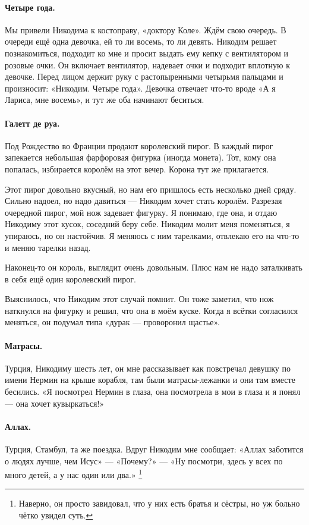 \documentclass{book}
\begin{document}
\paragraph{Четыре года.}
Мы привели Никодима к костоправу, «доктору Коле».
Ждём свою очередь.
В очереди ещё одна девочка, ей то ли восемь, то ли девять.
Никодим решает познакомиться, подходит ко мне и просит выдать ему кепку с вентилятором и розовые очки.
Он включает вентилятор, надевает очки и подходит вплотную к девочке.
Перед лицом держит руку с растопыренными четырьмя пальцами и произносит:
«Никодим. Четыре года».
Девочка отвечает что-то вроде «А я Лариса, мне восемь», и тут же оба начинают беситься.

\paragraph{Галетт де руа.}
Под Рождество во Франции продают королевский пирог.
В каждый пирог запекается небольшая фарфоровая фигурка (иногда монета).
Тот, кому она попалась, избирается королём на этот вечер.
Корона тут же прилагается.

Этот пирог довольно вкусный, но нам его пришлось есть несколько дней сряду.
Сильно надоел, но надо давиться --- Никодим хочет стать королём.
Разрезая очередной пирог, мой нож задевает фигурку.
Я понимаю, где она, и отдаю Никодиму этот кусок,
соседний беру себе.
Никодим молит меня поменяться, я упираюсь, но он настойчив.
Я меняюсь с ним тарелками, отвлекаю его на что-то и меняю тарелки назад.

Наконец-то он король, выглядит очень довольным.
Плюс нам не надо заталкивать в себя ещё один королевский пирог.

Выяснилось, что Никодим этот случай помнит.
Он тоже заметил, что нож наткнулся на фигурку и решил, что она в моём куске.
Когда я всётки согласился меняться, он подумал типа «дурак --- проворонил щастье».

\paragraph{Матрасы.}
Турция, Никодиму шесть лет, он мне рассказывает как повстречал девушку по имени Нермин на крыше корабля,
там были матрасы-лежанки и они там вместе бесились.
«Я посмотрел Нермин в глаза, она посмотрела в мои в глаза и я понял --- она хочет кувыркаться!»

\paragraph{Аллах.}
Турция, Стамбул, та же поездка.
Вдруг Никодим мне сообщает: «Аллах заботится о людях лучше, чем Исус» --- «Почему?» --- «Ну посмотри, здесь у всех по много детей, а у нас один или два.»%
\footnote{Наверно, он просто завидовал, что у них есть братья и сёстры, но уж больно чётко увидел суть.} 
\end{document}
